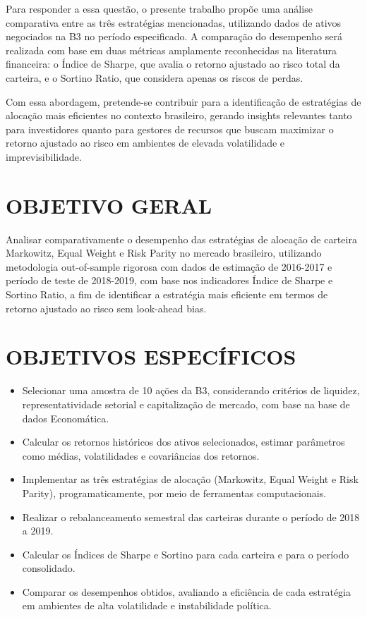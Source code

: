 Para responder a essa questão, o presente trabalho propõe uma análise comparativa entre as três estratégias mencionadas, utilizando dados de ativos negociados na B3 no período especificado. A comparação do desempenho será realizada com base em duas métricas amplamente reconhecidas na literatura financeira: o Índice de Sharpe, que avalia o retorno ajustado ao risco total da carteira, e o Sortino Ratio, que considera apenas os riscos de perdas.

Com essa abordagem, pretende-se contribuir para a identificação de estratégias de alocação mais eficientes no contexto brasileiro, gerando insights relevantes tanto para investidores quanto para gestores de recursos que buscam maximizar o retorno ajustado ao risco em ambientes de elevada volatilidade e imprevisibilidade.

\section{OBJETIVO GERAL}

Analisar comparativamente o desempenho das estratégias de alocação de carteira Markowitz, Equal Weight e Risk Parity no mercado brasileiro, utilizando metodologia out-of-sample rigorosa com dados de estimação de 2016-2017 e período de teste de 2018-2019, com base nos indicadores Índice de Sharpe e Sortino Ratio, a fim de identificar a estratégia mais eficiente em termos de retorno ajustado ao risco sem look-ahead bias.

\section{OBJETIVOS ESPECÍFICOS}

\begin{itemize}
    \item Selecionar uma amostra de 10 ações da B3, considerando critérios de liquidez, representatividade setorial e capitalização de mercado, com base na base de dados Economática.
    
    \item Calcular os retornos históricos dos ativos selecionados, estimar parâmetros como médias, volatilidades e covariâncias dos retornos.
    
    \item Implementar as três estratégias de alocação (Markowitz, Equal Weight e Risk Parity), programaticamente, por meio de ferramentas computacionais.
    
    \item Realizar o rebalanceamento semestral das carteiras durante o período de 2018 a 2019.
    
    \item Calcular os Índices de Sharpe e Sortino para cada carteira e para o período consolidado.
    
    \item Comparar os desempenhos obtidos, avaliando a eficiência de cada estratégia em ambientes de alta volatilidade e instabilidade política.
\end{itemize}

